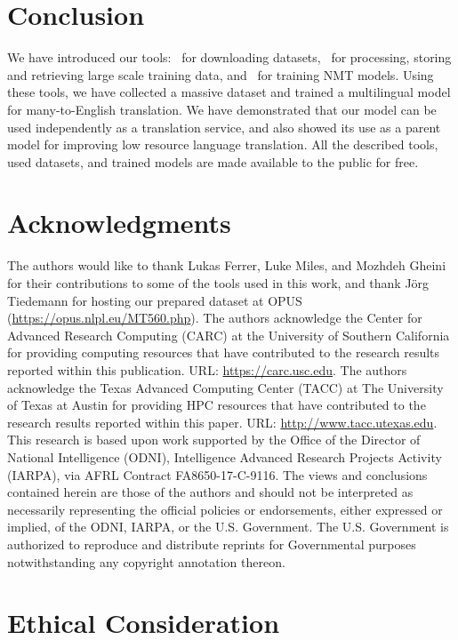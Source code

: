 \section{Conclusion}

We have introduced our tools: \mtdata\ for downloading datasets, \nlcodec\ for processing, storing and retrieving large scale training data, and \rtg\ for training NMT models.
Using these tools, we have collected a massive dataset and trained a multilingual model for many-to-English translation.
We have demonstrated that our model can be used independently as a translation service, and also showed its use as a parent model for improving low resource language translation. 
All the described tools, used datasets, and trained models are made available to the public for free. 

\section*{Acknowledgments}
The authors would like to thank Lukas Ferrer, Luke Miles, and Mozhdeh Gheini for their contributions to some of the tools used in this work, and thank Jörg Tiedemann for hosting our prepared dataset at OPUS (\url{https://opus.nlpl.eu/MT560.php}). 
The authors acknowledge the Center for Advanced Research Computing (CARC) at the University of Southern California for providing computing resources that have contributed to the research results reported within this publication. URL: \url{https://carc.usc.edu}. 
The authors acknowledge the Texas Advanced Computing Center (TACC) at The University of Texas at Austin for providing HPC resources that have contributed to the research results reported within this paper. URL: \url{http://www.tacc.utexas.edu}. This research is based upon work supported by the Office of the Director of National Intelligence (ODNI), Intelligence Advanced Research Projects Activity (IARPA), via AFRL Contract FA8650-17-C-9116.  The views and conclusions contained herein are those of the authors and should not be interpreted as necessarily representing the official policies or endorsements, either expressed or implied, of the ODNI, IARPA, or the U.S. Government. The U.S. Government is authorized to reproduce and distribute reprints for Governmental purposes notwithstanding any copyright annotation thereon.





\section*{Ethical Consideration}

